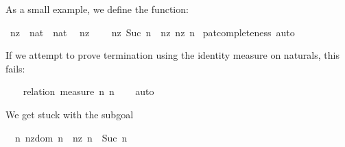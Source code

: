 \begin{isabellebody}
\begin{isamarkuptext}
  As a small example, we define the  function:%
\end{isamarkuptext}%
\isamarkuptrue%
\isamarkupfalse%
\ nz\ {\isacharcolon}{\isacharcolon}\ {\isachardoublequoteopen}nat\ {\isasymRightarrow}\ nat{\isachardoublequoteclose}\isanewline
{}\isanewline
\ \ {\isachardoublequoteopen}nz\ {}\ {\isacharequal}\ {}{\isachardoublequoteclose}\isanewline
{\isacharbar}\ {\isachardoublequoteopen}nz\ {\isacharparenleft}Suc\ n{\isacharparenright}\ {\isacharequal}\ nz\ {\isacharparenleft}nz\ n{\isacharparenright}{\isachardoublequoteclose}\isanewline
%
\isadelimproof
%
\endisadelimproof
%
\isatagproof
{}\isamarkupfalse%
\ pat{\isacharunderscore}completeness\ auto%
\endisatagproof
{\isafoldproof}%
%
\isadelimproof
%
\endisadelimproof
%
\begin{isamarkuptext}%
If we attempt to prove termination using the identity measure on
  naturals, this fails:%
\end{isamarkuptext}%
\isamarkuptrue%
\isamarkupfalse%
\isanewline
%
\isadelimproof
\ \ %
\endisadelimproof
%
\isatagproof
{}\isamarkupfalse%
\ {\isacharparenleft}relation\ {\isachardoublequoteopen}measure\ {\isacharparenleft}{\isasymlambda}n{\isachardot}\ n{\isacharparenright}{\isachardoublequoteclose}{\isacharparenright}\isanewline
\ \ \isamarkupfalse%
\ auto%
\begin{isamarkuptxt}%
We get stuck with the subgoal

  \begin{isabelle}%
\ {}{\isachardot}\ {\isasymAnd}n{\isachardot}\ nz{\isacharunderscore}dom\ n\ {\isasymLongrightarrow}\ nz\ n\ {\isacharless}\ Suc\ n%
\end{isabelle}


\end{isamarkuptxt}
\end{isabellebody}
